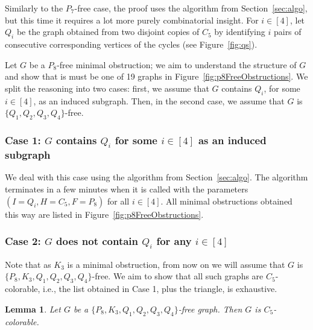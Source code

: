 \documentclass[11pt,a4paper]{article}
\theoremstyle{mystyle}
\newtheorem{lemma}[theorem]{Lemma}
\begin{document}
\thmfinitepaths*

Similarly to the $P_7$-free case, the proof uses the algorithm from Section~\ref{sec:algo},
but this time it requires a lot more purely combinatorial insight.
For $i \in [4]$, let $Q_i$ be the graph obtained from two disjoint copies of $C_5$ by identifying $i$ pairs of consecutive corresponding vertices of the cycles (see Figure~\ref{fig:qs}).



Let $G$ be a $P_8$-free minimal obstruction; we aim to understand the structure of $G$ and show that is must be one of 19 graphs in Figure~\ref{fig:p8FreeObstructions}.
We split the reasoning into two cases: first, we assume that $G$ contains $Q_i$, for some $i \in [4]$, as an induced subgraph.
Then, in the second case, we assume that $G$ is $\{Q_1,Q_2,Q_3,Q_4\}$-free.


\subsubsection*{Case 1: $G$ contains $Q_i$ for some $i \in [4]$ as an induced subgraph}

We deal with this case using the algorithm from Section~\ref{sec:algo}.
The algorithm terminates in a few minutes when it is called with the parameters $(I=Q_i,H=C_5,F=P_8)$ for all $i \in [4]$.
All minimal obstructions obtained this way are listed in Figure~\ref{fig:p8FreeObstructions}.

\subsubsection*{Case 2: $G$ does not contain $Q_i$ for any $i \in [4]$}

Note that as  $K_3$ is a minimal obstruction, from now on we will assume that $G$ is $\{P_8,K_3,Q_1,Q_2,Q_3,Q_4\}$-free.
We aim to show that all such graphs are $C_5$-colorable, i.e., the list obtained in Case 1, plus the triangle, is exhaustive.


\begin{lemma}
Let $G$ be a $\{P_8,K_3,Q_1,Q_2,Q_3,Q_4\}$-free graph. Then $G$ is $C_5$-colorable.
\end{lemma}
\end{document}
